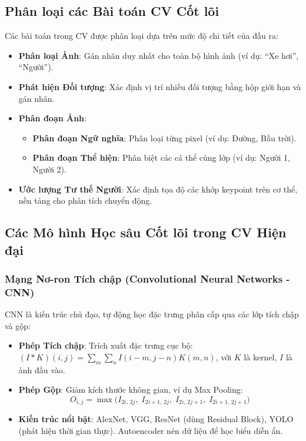 \subsection{Phân loại các Bài toán CV Cốt lõi}
Các bài toán trong CV được phân loại dựa trên mức độ chi tiết của đầu ra:

\begin{itemize}
    \item \textbf{Phân loại Ảnh}: Gán nhãn duy nhất cho toàn bộ hình ảnh (ví dụ: ``Xe hơi'', ``Người'').\autocite{krizhevsky2012}
    \item \textbf{Phát hiện Đối tượng}: Xác định vị trí nhiều đối tượng bằng hộp giới hạn và gán nhãn.\autocite{redmon2016}
    \item \textbf{Phân đoạn Ảnh}:
    \begin{itemize}
        \item \textbf{Phân đoạn Ngữ nghĩa}: Phân loại từng pixel (ví dụ: Đường, Bầu trời).\autocite{ronneberger2015}
        \item \textbf{Phân đoạn Thể hiện}: Phân biệt các cá thể cùng lớp (ví dụ: Người 1, Người 2).\autocite{ronneberger2015}
    \end{itemize}
    \item \textbf{Ước lượng Tư thế Người}: Xác định tọa độ các khớp keypoint trên cơ thể, nền tảng cho phân tích chuyển động.\autocite{lin2014}
\end{itemize}

\subsection{Các Mô hình Học sâu Cốt lõi trong CV Hiện đại}
\subsubsection{Mạng Nơ-ron Tích chập (Convolutional Neural Networks - CNN)}
CNN là kiến trúc chủ đạo, tự động học đặc trưng phân cấp qua các lớp tích chập và gộp:

\begin{itemize}
    \item \textbf{Phép Tích chập}: Trích xuất đặc trưng cục bộ: $(I * K)(i, j) = \sum_{m} \sum_{n} I(i-m, j-n) K(m, n)$, với $K$ là kernel, $I$ là ảnh đầu vào.\autocite{lecun1998}
    \item \textbf{Phép Gộp}: Giảm kích thước không gian, ví dụ Max Pooling:
\[
O_{i,j} = \max \bigl( I_{2i,\,2j},\; I_{2i+1,\,2j},\; I_{2i,\,2j+1},\; I_{2i+1,\,2j+1} \bigr)
\]
\autocite{lecun1998}
    \item \textbf{Kiến trúc nổi bật}: AlexNet, VGG, ResNet (dùng Residual Block), YOLO (phát hiện thời gian thực).\autocite{krizhevsky2012,simonyan2014,he2016,redmon2016} Autoencoder nén dữ liệu để học biểu diễn ẩn.\autocite{szeliski2010}
\end{itemize}

